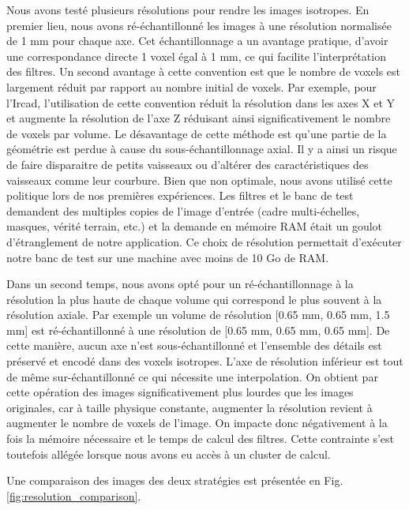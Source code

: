 Nous avons testé plusieurs résolutions pour rendre les images isotropes. En premier lieu, nous avons ré-échantillonné les images à une résolution normalisée de 1 mm pour chaque axe. Cet échantillonnage a un avantage pratique, d'avoir une correspondance directe 1 voxel égal à 1 mm, ce qui facilite l'interprétation des filtres. Un second avantage à cette convention est que le nombre de voxels est largement réduit par rapport au nombre initial de voxels.
Par exemple, pour l'Ircad, l'utilisation de cette convention  réduit la résolution dans les axes X et Y et augmente la résolution de l'axe Z réduisant ainsi significativement le nombre de voxels par volume. Le désavantage de cette méthode est qu'une partie de la géométrie est perdue à cause du sous-échantillonnage axial. Il y a ainsi un risque de faire disparaitre de petits vaisseaux ou d'altérer des caractéristiques des vaisseaux comme leur courbure.  Bien que non optimale, nous avons utilisé cette politique lors de nos premières expériences. Les filtres et le banc de test demandent des multiples copies de l'image d'entrée (cadre multi-échelles, masques, vérité terrain, etc.) et la demande en mémoire RAM était un goulot d'étranglement de notre application. Ce choix de résolution permettait d'exécuter notre banc de test sur une machine avec moins de 10 Go de RAM.

Dans un second temps, nous avons opté pour un ré-échantillonnage à la résolution la plus haute de chaque volume qui correspond le plus souvent à la résolution axiale. Par exemple un volume de résolution [0.65 mm, 0.65 mm, 1.5 mm] est ré-échantillonné à une résolution de [0.65 mm, 0.65 mm, 0.65 mm]. De cette manière, aucun axe n'est sous-échantillonné et l'ensemble des détails est préservé et encodé dans des voxels isotropes. L'axe de résolution inférieur est tout de même sur-échantillonné ce qui nécessite une interpolation. On obtient par cette opération des images significativement plus lourdes que les images originales, car à taille physique constante, augmenter la résolution revient à augmenter le nombre de voxels de l'image. On impacte donc négativement à la fois la mémoire nécessaire et le temps de calcul des filtres. Cette contrainte s'est toutefois allégée lorsque nous avons eu accès à un cluster de calcul.

Une comparaison des images des deux stratégies est présentée en Fig. \ref{fig:resolution_comparison}.

